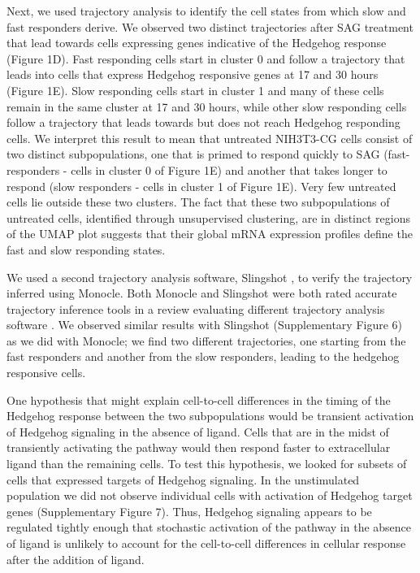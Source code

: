 Next, we used trajectory analysis \cite{Qiu2017-uz,Trapnell2014-ho} to identify the cell states from which slow and fast responders derive. We observed two distinct trajectories after SAG treatment that lead towards cells expressing genes indicative of the Hedgehog response (Figure 1D). Fast responding cells start in cluster 0 and follow a trajectory that leads into cells that express Hedgehog responsive genes at 17 and 30 hours (Figure 1E). Slow responding cells start in cluster 1 and many of these cells remain in the same cluster at 17 and 30 hours, while other slow responding cells follow a trajectory that leads towards but does not reach Hedgehog responding cells. We interpret this result to mean that untreated NIH3T3-CG cells consist of two distinct subpopulations, one that is primed to respond quickly to SAG (fast-responders - cells in cluster 0 of Figure 1E) and another that takes longer to respond (slow responders - cells in cluster 1 of Figure 1E). Very few untreated cells lie outside these two clusters. The fact that these two subpopulations of untreated cells, identified through unsupervised clustering, are in distinct regions of the UMAP plot suggests that their global mRNA expression profiles define the fast and slow responding states.

We used a second trajectory analysis software, Slingshot \cite{Street2018-ak}, to verify the trajectory inferred using Monocle. Both Monocle and Slingshot were both rated accurate trajectory inference tools in a review evaluating different trajectory analysis software \cite{Saelens2019-fq}. We observed similar results with Slingshot (Supplementary Figure 6) as we did with Monocle; we find two different trajectories, one starting from the fast responders and another from the slow responders, leading to the hedgehog responsive cells.

One hypothesis that might explain cell-to-cell differences in the timing of the Hedgehog response between the two subpopulations would be transient activation of Hedgehog signaling in the absence of ligand. Cells that are in the midst of transiently activating the pathway would then respond faster to extracellular ligand than the remaining cells. To test this hypothesis, we looked for subsets of cells that expressed targets of Hedgehog signaling. In the unstimulated population we did not observe individual cells with activation of Hedgehog target genes (Supplementary Figure 7). Thus, Hedgehog signaling appears to be regulated tightly enough that stochastic activation of the pathway in the absence of ligand is unlikely to account for the cell-to-cell differences in cellular response after the addition of ligand.

